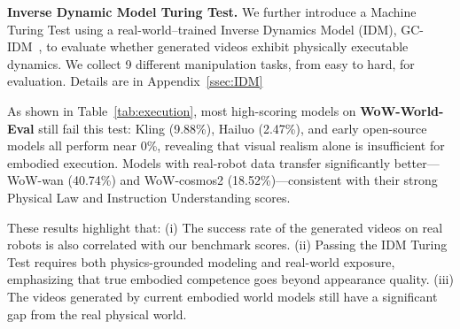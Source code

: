 \textbf{Inverse Dynamic Model Turing Test.}
We further introduce a Machine Turing Test using a real-world–trained Inverse Dynamics Model (IDM), GC-IDM~\cite{chi2025wow}, to evaluate whether generated videos exhibit physically executable dynamics. We collect 9 different manipulation tasks, from easy to hard, for evaluation. Details are in Appendix~\ref{ssec:IDM}

As shown in Table~\ref{tab:execution}, most high-scoring models on \textbf{WoW-World-Eval} still fail this test: Kling (9.88\%), Hailuo (2.47\%), and early open-source models all perform near 0\%, revealing that visual realism alone is insufficient for embodied execution. Models with real-robot data transfer significantly better—WoW-wan (40.74\%) and WoW-cosmos2 (18.52\%)—consistent with their strong Physical Law and Instruction Understanding scores.

These results highlight that: (i) The success rate of the generated videos on real robots is also correlated with our benchmark scores. (ii) Passing the IDM Turing Test requires both physics-grounded modeling and real-world exposure, emphasizing that true embodied competence goes beyond appearance quality. (iii) The videos generated by current embodied world models still have a significant gap from the real physical world.




